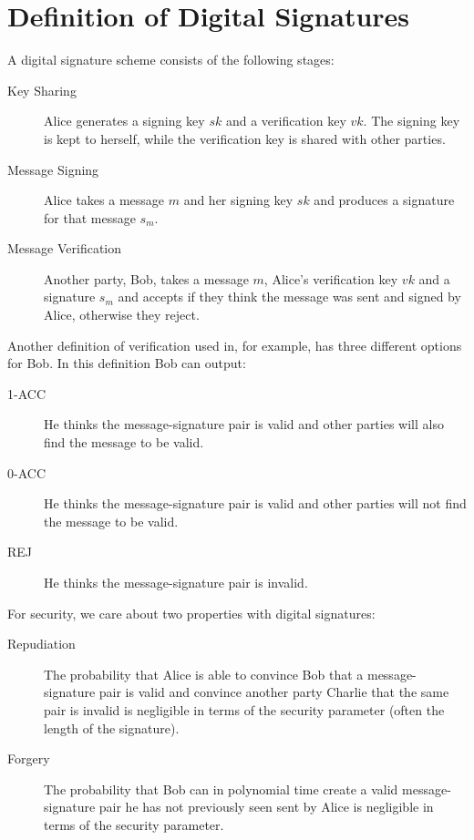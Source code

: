 \documentclass[%
 reprint,
 amsmath,amssymb,
 aps,
 pra,
]{revtex4-1}
\begin{document}
\section{Definition of Digital Signatures}

A digital signature scheme consists of the following stages:

\begin{description}
\item[Key Sharing]Alice generates a signing key $sk$ and a verification key $vk$. The signing key is kept to herself, while the verification key is shared with other parties.
\item[Message Signing]Alice takes a message $m$ and her signing key $sk$ and produces a signature for that message $s_m$.
\item[Message Verification]Another party, Bob, takes a message $m$, Alice's verification key $vk$ and a signature $s_m$ and accepts if they think the message was sent and signed by Alice, otherwise they reject.
\end{description}

Another definition of verification used in, for example, \cite{quant-ph/0105032} has three different options for Bob. In this definition Bob can output:

\begin{description}
\item[1-ACC]He thinks the message-signature pair is valid and other parties will also find the message to be valid.
\item[0-ACC]He thinks the message-signature pair is valid and other parties will not find the message to be valid.
\item[REJ]He thinks the message-signature pair is invalid.
\end{description}

For security, we care about two properties with digital signatures:

\begin{description}
\item[Repudiation]The probability that Alice is able to convince Bob that a message-signature pair is valid and convince another party Charlie that the same pair is invalid is negligible in terms of the security parameter (often the length of the signature).
\item[Forgery]The probability that Bob can in polynomial time create a valid message-signature pair he has not previously seen sent by Alice is negligible in terms of the security parameter.
\end{description}
\end{document}
